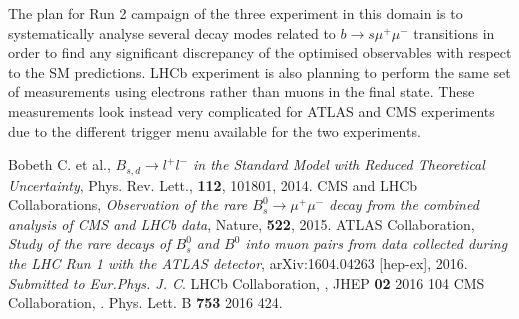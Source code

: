 \documentclass{PoS}
\begin{document}
The plan for Run 2 campaign of the three experiment in this domain is to systematically analyse several decay modes related to $b \to s \mu^+ \mu^-$  transitions in order to find any significant discrepancy of the optimised observables with respect to the SM predictions. LHCb experiment is also planning to perform the same set of measurements using electrons rather than muons in the final state. These measurements look instead very complicated for ATLAS and CMS experiments due to the different trigger menu available for the two experiments.


\begin{thebibliography}{99}
 Bobeth C. et al., {\it{$B_{s,d} \to l^+ l^-$ in the Standard Model with Reduced Theoretical Uncertainty}}, Phys. Rev. Lett., {\bf{112}}, 101801, 2014.
 CMS and LHCb Collaborations, {\it{Observation of the rare $B^0_s\rightarrow\mu^+\mu^-$ decay from the combined analysis of CMS and LHCb data}}, Nature, {\bf{522}}, 2015.
 ATLAS Collaboration, {\it{Study of the rare decays of $B^0_s$ and $B^0$  into muon pairs from data collected during the LHC Run 1 with the ATLAS detector}}, arXiv:1604.04263 [hep-ex], 2016. {\it{Submitted to Eur.Phys. J. C}}.
 LHCb Collaboration, {\it{}}, JHEP {\bf{02}} 2016 104 
 CMS Collaboration, {\it{}}. Phys. Lett. B {\bf{753}} 2016 424.
\end{thebibliography}
\end{document}
